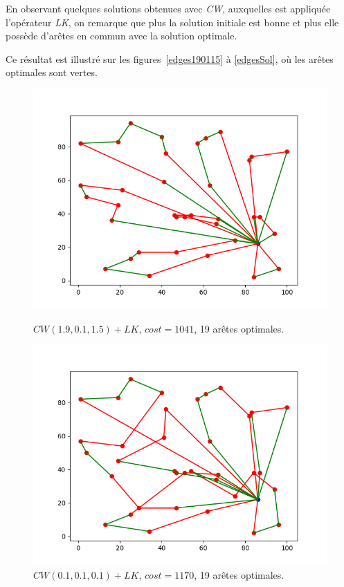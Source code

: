 \documentclass[a4paper,11pt]{article}%
\begin{document}
En observant quelques solutions obtenues avec \emph{CW}, auxquelles est appliquée l'opérateur \emph{LK}, on remarque que plus la solution initiale est bonne et plus elle possède d'arêtes en commun avec la solution optimale. 

Ce résultat est illustré sur les figures~\ref{edges190115} à \ref{edgesSol}, où les arêtes optimales sont vertes.


\begin{figure}
    \begin{minipage}[c]{.46\linewidth}
        \centering
  	\includegraphics[scale=0.4]{edges190115.png}
	\caption{$CW(1.9,0.1,1.5)+LK$, $cost = 1041$, 19 arêtes optimales.}
	\label{edges190115}
    \end{minipage}
    \hfill%
    \begin{minipage}[c]{.46\linewidth}
        \centering
	\includegraphics[scale=0.4]{edges101010.png}
	\caption{$CW(0.1,0.1,0.1)+LK$, $cost = 1170$, 19 arêtes optimales.}
	\label{edges101010}
    \end{minipage}


\end{figure}
\end{document}
